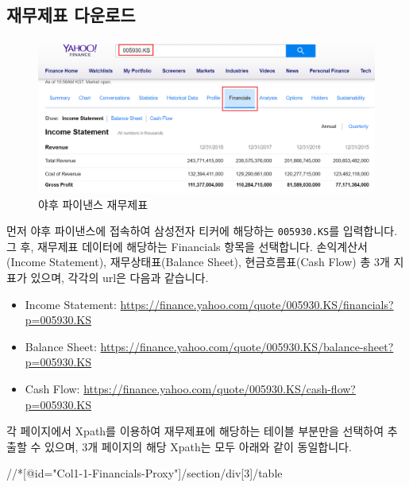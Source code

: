 \documentclass[]{book}
\newenvironment{Shaded}{\begin{snugshade}}{\end{snugshade}}
\newcommand{\NormalTok}[1]{#1}
\providecommand{\tightlist}{%
  \setlength{\itemsep}{0pt}\setlength{\parskip}{0pt}}
\begin{document}
\hypertarget{section-31}{%
\subsection{재무제표 다운로드}\label{section-31}}

\begin{figure}

{\centering \includegraphics{images/crawl_practice_yahoo} 

}

\caption{야후 파이낸스 재무제표}\label{fig:unnamed-chunk-30}
\end{figure}

먼저 야후 파이낸스에 접속하여 삼성전자 티커에 해당하는 \texttt{005930.KS}를 입력합니다. 그 후, 재무제표 데이터에 해당하는 Financials 항목을 선택합니다. 손익계산서(Income Statement), 재무상태표(Balance Sheet), 현금흐름표(Cash Flow) 총 3개 지표가 있으며, 각각의 url은 다음과 같습니다.

\begin{itemize}
\tightlist
\item
  Income Statement: \url{https://finance.yahoo.com/quote/005930.KS/financials?p=005930.KS}
\item
  Balance Sheet: \url{https://finance.yahoo.com/quote/005930.KS/balance-sheet?p=005930.KS}
\item
  Cash Flow: \url{https://finance.yahoo.com/quote/005930.KS/cash-flow?p=005930.KS}
\end{itemize}

각 페이지에서 Xpath를 이용하여 재무제표에 해당하는 테이블 부분만을 선택하여 추출할 수 있으며, 3개 페이지의 해당 Xpath는 모두 아래와 같이 동일합니다.

\begin{Shaded}
\begin{Highlighting}[]
\NormalTok{//*[@id="Col1-1-Financials-Proxy"]/section/div[3]/table}
\end{Highlighting}
\end{Shaded}
\end{document}
